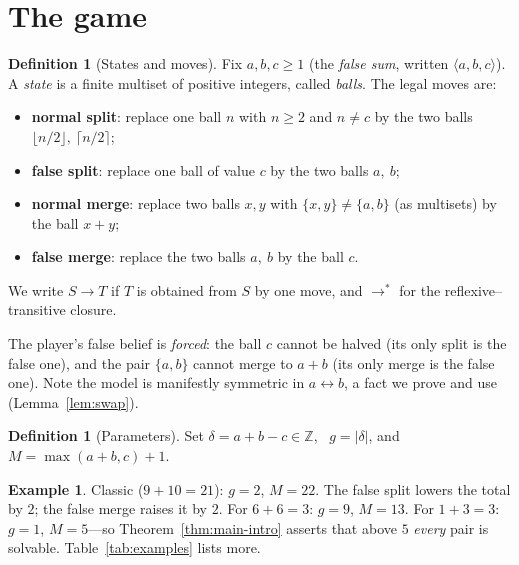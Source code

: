 \documentclass[11pt]{article}
\theoremstyle{definition}
\newtheorem{definition}[theorem]{Definition}
\newtheorem{example}[theorem]{Example}
\theoremstyle{remark}
\newcommand{\lie}[3]{\langle #1,#2,#3\rangle}
\newcommand{\reach}{\longrightarrow^{*}}
\newcommand{\move}{\longrightarrow}
\newcommand{\Z}{\mathbb{Z}}
\begin{document}
\section{The game}\label{sec:model}

\begin{definition}[States and moves]\label{def:moves}
Fix $a,b,c\ge 1$ (the \emph{false sum}, written $\lie{a}{b}{c}$).  A
\emph{state} is a finite multiset of positive integers, called
\emph{balls}.  The legal moves are:
\begin{itemize}
\item \textbf{normal split}: replace one ball $n$ with $n\ge 2$ and
$n\ne c$ by the two balls $\lfloor n/2\rfloor,\ \lceil n/2\rceil$;
\item \textbf{false split}: replace one ball of value $c$ by the two balls
$a,\ b$;
\item \textbf{normal merge}: replace two balls $x,y$ with
$\{x,y\}\ne\{a,b\}$ (as multisets) by the ball $x+y$;
\item \textbf{false merge}: replace the two balls $a,\ b$ by the ball $c$.
\end{itemize}
We write $S\move T$ if $T$ is obtained from $S$ by one move, and $\reach$
for the reflexive--transitive closure.
\end{definition}

The player's false belief is \emph{forced}: the ball $c$ cannot be halved
(its only split is the false one), and the pair $\{a,b\}$ cannot merge to
$a+b$ (its only merge is the false one).  Note the model is manifestly
symmetric in $a\leftrightarrow b$, a fact we prove and use
(Lemma~\ref{lem:swap}).

\begin{definition}[Parameters]\label{def:params}
Set $\delta=a+b-c\in\Z$, \ $g=|\delta|$, and $M=\max(a+b,c)+1$.
\end{definition}

\begin{example}
Classic ($9+10=21$): $g=2$, $M=22$.  The false split lowers the
total by $2$; the false merge raises it by $2$.  For $6+6=3$: $g=9$,
$M=13$.  For $1+3=3$: $g=1$, $M=5$---so Theorem~\ref{thm:main-intro} asserts
that above $5$ \emph{every} pair is solvable.  Table~\ref{tab:examples}
lists more.
\end{example}
\end{document}
